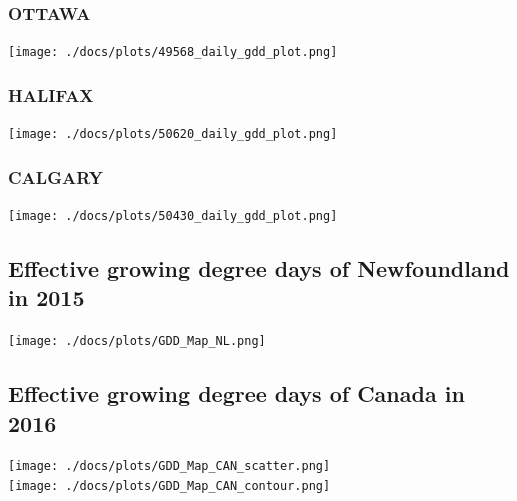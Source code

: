 \documentclass{article}
\begin{document}
\subsubsection{OTTAWA}
\begin{center}
\texttt{[image: ./docs/plots/49568\_daily\_gdd\_plot.png]}\\
\end{center}


\subsubsection{HALIFAX}

\texttt{[image: ./docs/plots/50620\_daily\_gdd\_plot.png]}\\

\subsubsection{CALGARY}

\texttt{[image: ./docs/plots/50430\_daily\_gdd\_plot.png]}\\


\subsection{Effective growing degree days of Newfoundland in 2015}

\texttt{[image: ./docs/plots/GDD\_Map\_NL.png]}\\

\subsection{Effective growing degree days of Canada in 2016}

\texttt{[image: ./docs/plots/GDD\_Map\_CAN\_scatter.png]}\\

\texttt{[image: ./docs/plots/GDD\_Map\_CAN\_contour.png]}\\
\end{document}
